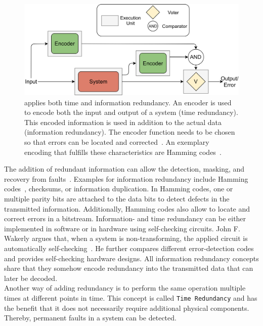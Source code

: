 \begin{figure}[!hb]
	\centering
	\includegraphics[width=0.8\linewidth]{images/ECC}
	\caption{ applies both time and information redundancy. An encoder is used to encode both the input and output of a system (time redundancy). This encoded information is used in addition to the actual data (information redundancy). The encoder function needs to be chosen so that errors can be located and corrected~\cite{Su2005ECC}. An exemplary encoding that fulfills these characteristics are Hamming codes~\cite{HammingCodes}.}
	\label{fig:ECC}
\end{figure}

The addition of redundant information can allow the detection, masking, and recovery from faults~\cite{BarryFaultToleranceAnalysis}.
Examples for information redundancy include Hamming codes~\cite{HammingCodes}, checksums, or information duplication.
In Hamming codes, one or multiple parity bits are attached to the data bits to detect defects in the transmitted information.
Additionally, Hamming codes also allow to locate and correct errors in a bitstream.
Information- and time redundancy can be either implemented in software or in hardware using self-checking circuits.
John F. Wakerly argues that, when a system is non-transforming, the applied circuit is automatically self-checking~\cite{SelfCheckingProcessorDesign}.
He further compares different error-detection codes and provides self-checking hardware designs.
All information redundancy concepts share that they somehow encode redundancy into the transmitted data that can later be decoded.
\\

Another way of adding redundancy is to perform the same operation multiple times at different points in time.
This concept is called \texttt{Time Redundancy} and has the benefit that it does not necessarily require additional physical components.
Thereby, permanent faults in a system can be detected.

